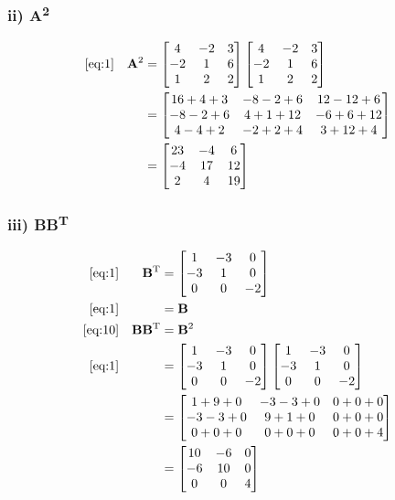 \documentclass{article}
\begin{document}
\subsubsection*{ii) \textbf{A}\textsuperscript{2}}

\begin{align}
    \label{eq:6}
    \eqref{eq:1} &&
    \textbf{A}\textsuperscript{2} &= \begin{bmatrix} 4 & -2 & 3\\ -2 & 1 & 6\\ 1 & 2 & 2 \end{bmatrix} \begin{bmatrix} 4 & -2 & 3\\ -2 & 1 & 6\\ 1 & 2 & 2 \end{bmatrix}
    \\
    \label{eq:7}
    && &= \begin{bmatrix}
    16+4+3 & -8-2+6 & 12-12+6 \\
    -8-2+6 & 4+1+12 & -6+6+12 \\
    4-4+2 & -2+2+4 & 3+12+4
    \end{bmatrix}
    \\
    \label{eq:8}
    && &= \begin{bmatrix}
    23 & -4 & 6\\
    -4 & 17 & 12\\
    2 & 4 & 19
    \end{bmatrix}
\end{align}

\subsubsection*{iii) \textbf{BB}\textsuperscript{T}}

\begin{align}
    \label{eq:9}
    \eqref{eq:1} &&
    \textbf{B}\textsuperscript{T} &= \begin{bmatrix} 1 & -3 & 0\\ -3 & 1 & 0\\ 0 & 0 & -2 \end{bmatrix}
    \\
    \label{eq:10}
    \eqref{eq:1} &&
    &= \textbf{B}
    \\
    \label{eq:11}
    \eqref{eq:10} &&
    \textbf{BB}\textsuperscript{T} &= \textbf{B}\textsuperscript{2}
    \\
    \label{eq:12}
    \eqref{eq:1} &&
    &= \begin{bmatrix} 1 & -3 & 0\\ -3 & 1 & 0\\ 0 & 0 & -2 \end{bmatrix} \begin{bmatrix} 1 & -3 & 0\\ -3 & 1 & 0\\ 0 & 0 & -2 \end{bmatrix}
    \\
    \label{eq:13}
    && &= \begin{bmatrix}
    1+9+0 & -3-3+0 & 0+0+0\\
    -3-3+0 & 9+1+0 & 0+0+0\\
    0+0+0 & 0+0+0 & 0+0+4
    \end{bmatrix}
    \\
    \label{eq:14}
    && &= \begin{bmatrix}
    10 & -6 & 0\\
    -6 & 10 & 0\\
    0 & 0 & 4
    \end{bmatrix}
\end{align}
\end{document}
